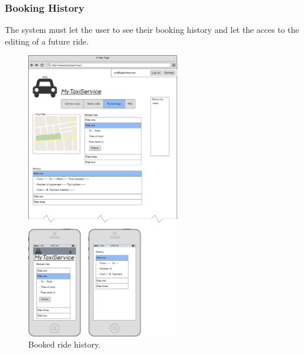 		\subsubsection {Booking History}
			The system must let the user to see their booking history and let the acces to the editing of a future ride.
			\begin{figure}[h!]
				\includegraphics[width=0.6\textwidth]{mockup/history}
				\caption{Booked ride history.}
			\end{figure}
